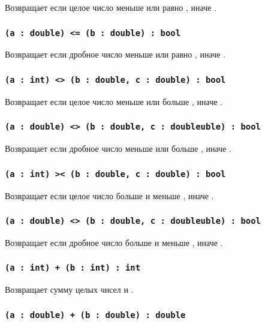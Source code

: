 Возвращает \true{} если целое число  меньше или равно , иначе \false{}.

\subsubsection{\lstinline`(a : double) <= (b : double) : bool`}

Возвращает \true{} если дробное число  меньше или равно , иначе \false{}.

\subsubsection{\lstinline`(a : int) <> (b : double, c : double) : bool`}

Возвращает \true{} если целое число  меньше  или больше , иначе \false{}.

\subsubsection{\lstinline`(a : double) <> (b : double, c : doubleuble) : bool`}

Возвращает \true{} если дробное число  меньше  или больше , иначе \false{}.

\subsubsection{\lstinline`(a : int) >< (b : double, c : double) : bool`}

Возвращает \true{} если целое число  больше  и меньше , иначе \false{}.

\subsubsection{\lstinline`(a : double) <> (b : double, c : doubleuble) : bool`}

Возвращает \true{} если дробное число  больше  и меньше , иначе \false{}.


\subsubsection{\lstinline`(a : int) + (b : int) : int`}

Возвращает сумму целых чисел  и .

\subsubsection{\lstinline`(a : double) + (b : double) : double`}

